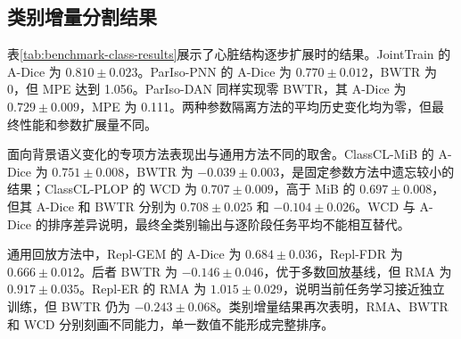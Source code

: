 \subsection{类别增量分割结果}

表\ref{tab:benchmark-class-results}展示了心脏结构逐步扩展时的结果。JointTrain 的 A-Dice 为 $0.810\pm0.023$。ParIso-PNN 的 A-Dice 为 $0.770\pm0.012$，BWTR 为 0，但 MPE 达到 1.056。ParIso-DAN 同样实现零 BWTR，其 A-Dice 为 $0.729\pm0.009$，MPE 为 0.111。两种参数隔离方法的平均历史变化均为零，但最终性能和参数扩展量不同。

面向背景语义变化的专项方法表现出与通用方法不同的取舍。ClassCL-MiB 的 A-Dice 为 $0.751\pm0.008$，BWTR 为 $-0.039\pm0.003$，是固定参数方法中遗忘较小的结果；ClassCL-PLOP 的 WCD 为 $0.707\pm0.009$，高于 MiB 的 $0.697\pm0.008$，但其 A-Dice 和 BWTR 分别为 $0.708\pm0.025$ 和 $-0.104\pm0.026$。WCD 与 A-Dice 的排序差异说明，最终全类别输出与逐阶段任务平均不能相互替代。

通用回放方法中，Repl-GEM 的 A-Dice 为 $0.684\pm0.036$，Repl-FDR 为 $0.666\pm0.012$。后者 BWTR 为 $-0.146\pm0.046$，优于多数回放基线，但 RMA 为 $0.917\pm0.035$。Repl-ER 的 RMA 为 $1.015\pm0.029$，说明当前任务学习接近独立训练，但 BWTR 仍为 $-0.243\pm0.068$。类别增量结果再次表明，RMA、BWTR 和 WCD 分别刻画不同能力，单一数值不能形成完整排序。

